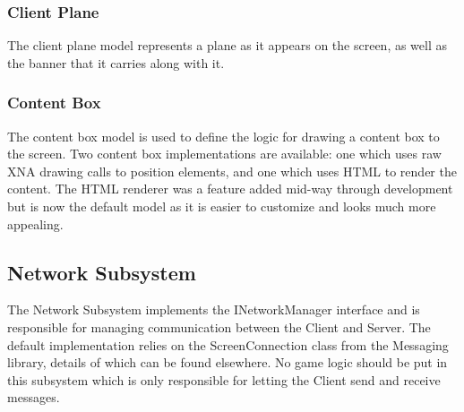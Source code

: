 \subsubsection{Client Plane}
The client plane model represents a plane as it appears on the screen, as well
as the banner that it carries along with it.

\subsubsection{Content Box}
The content box model is used to define the logic for drawing a content box to
the screen. Two content box implementations are available: one which uses raw
XNA drawing calls to position elements, and one which uses HTML to render the
content. The HTML renderer was a feature added mid-way through development but
is now the default model as it is easier to customize and looks much more
appealing. 

\subsection{Network Subsystem}
The Network Subsystem implements the INetworkManager interface and is 
responsible for managing communication between the Client and Server. The 
default implementation relies on the ScreenConnection class from the Messaging
library, details of which can be found elsewhere. No game logic should be put in
this subsystem which is only responsible for letting the Client send and receive 
messages.

